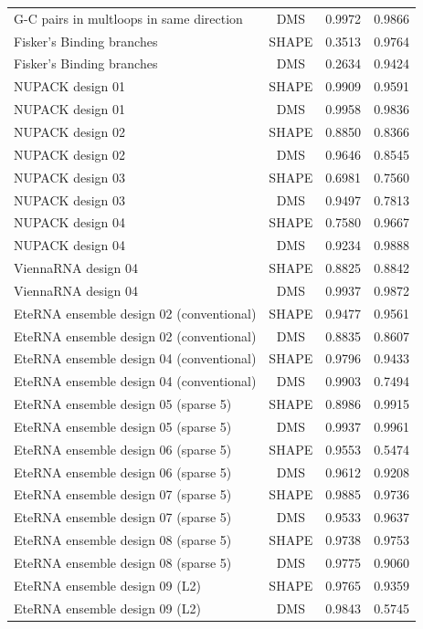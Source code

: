 \documentclass[letter]{bioinfo}
\begin{document}
\begin{center}
\begin{longtable}{lccc}
G-C pairs in multloops in same direction	&	DMS	&	0.9972 	&	0.9866 	\\
Fisker's Binding branches	&	SHAPE	&	0.3513 	&	0.9764 	\\
Fisker's Binding branches	&	DMS	&	0.2634 	&	0.9424 	\\
NUPACK design 01	&	SHAPE	&	0.9909 	&	0.9591 	\\
NUPACK design 01	&	DMS	&	0.9958 	&	0.9836 	\\
NUPACK design 02	&	SHAPE	&	0.8850 	&	0.8366 	\\
NUPACK design 02	&	DMS	&	0.9646 	&	0.8545 	\\
NUPACK design 03	&	SHAPE	&	0.6981 	&	0.7560 	\\
NUPACK design 03	&	DMS	&	0.9497 	&	0.7813 	\\
NUPACK design 04	&	SHAPE	&	0.7580 	&	0.9667 	\\
NUPACK design 04	&	DMS	&	0.9234 	&	0.9888 	\\
ViennaRNA design 04	&	SHAPE	&	0.8825 	&	0.8842 	\\
ViennaRNA design 04	&	DMS	&	0.9937 	&	0.9872 	\\
EteRNA ensemble design 02 (conventional)	&	SHAPE	&	0.9477 	&	0.9561 	\\
EteRNA ensemble design 02 (conventional)	&	DMS	&	0.8835 	&	0.8607 	\\
EteRNA ensemble design 04 (conventional)	&	SHAPE	&	0.9796 	&	0.9433 	\\
EteRNA ensemble design 04 (conventional)	&	DMS	&	0.9903 	&	0.7494 	\\
EteRNA ensemble design 05 (sparse 5)	&	SHAPE	&	0.8986 	&	0.9915 	\\
EteRNA ensemble design 05 (sparse 5)	&	DMS	&	0.9937 	&	0.9961 	\\
EteRNA ensemble design 06 (sparse 5)	&	SHAPE	&	0.9553 	&	0.5474 	\\
EteRNA ensemble design 06 (sparse 5)	&	DMS	&	0.9612 	&	0.9208 	\\
EteRNA ensemble design 07 (sparse 5)	&	SHAPE	&	0.9885 	&	0.9736 	\\
EteRNA ensemble design 07 (sparse 5)	&	DMS	&	0.9533 	&	0.9637 	\\
EteRNA ensemble design 08 (sparse 5)	&	SHAPE	&	0.9738 	&	0.9753 	\\
EteRNA ensemble design 08 (sparse 5)	&	DMS	&	0.9775 	&	0.9060 	\\
EteRNA ensemble design 09 (L2)	&	SHAPE	&	0.9765 	&	0.9359 	\\
EteRNA ensemble design 09 (L2)	&	DMS	&	0.9843 	&	0.5745 	\\

\end{longtable}
\end{center}
\end{document}
